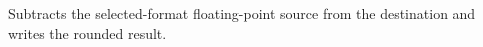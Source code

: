 Subtracts the selected-format floating-point source from the destination and writes the rounded result.
